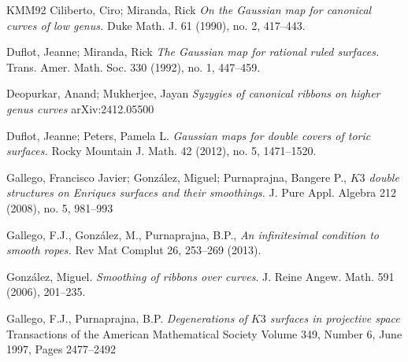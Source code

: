 \documentclass[11pt,twoside]{amsart}
\theoremstyle{plain}
\numberwithin{equation}{section}
\theoremstyle{definition}
\begin{document}
\begin{thebibliography}{KMM92}
Ciliberto, Ciro; Miranda, Rick
\emph{On the Gaussian map for canonical curves of low genus.}
Duke Math. J. 61 (1990), no. 2, 417–443.

Duflot, Jeanne; Miranda, Rick
\emph{The Gaussian map for rational ruled surfaces.}
Trans. Amer. Math. Soc. 330 (1992), no. 1, 447–459.

Deopurkar, Anand; Mukherjee, Jayan
\emph{Syzygies of canonical ribbons on higher genus curves}
arXiv:2412.05500


Duflot, Jeanne; Peters, Pamela L.
\emph{Gaussian maps for double covers of toric surfaces.}
Rocky Mountain J. Math. 42 (2012), no. 5, 1471–1520.













 

\color{black}




Gallego, Francisco Javier; González, Miguel; Purnaprajna, Bangere P., 
\emph{$K3$ double structures on Enriques surfaces and their smoothings.}
J. Pure Appl. Algebra 212 (2008), no. 5, 981--993

Gallego, F.J., González, M., Purnaprajna, B.P., 
\emph{An infinitesimal condition to smooth ropes.}
Rev Mat Complut 26, 253–269 (2013).

  Gonz\'alez, Miguel.
  \emph{Smoothing of ribbons over curves}.
  J. Reine Angew. Math. 591 (2006), 201--235.

Gallego, F.J., Purnaprajna, B.P.
\emph{Degenerations of $K3$ surfaces in projective space}
Transactions of the American Mathematical Society
Volume 349, Number 6, June 1997, Pages 2477–2492




\end{thebibliography}
\end{document}

